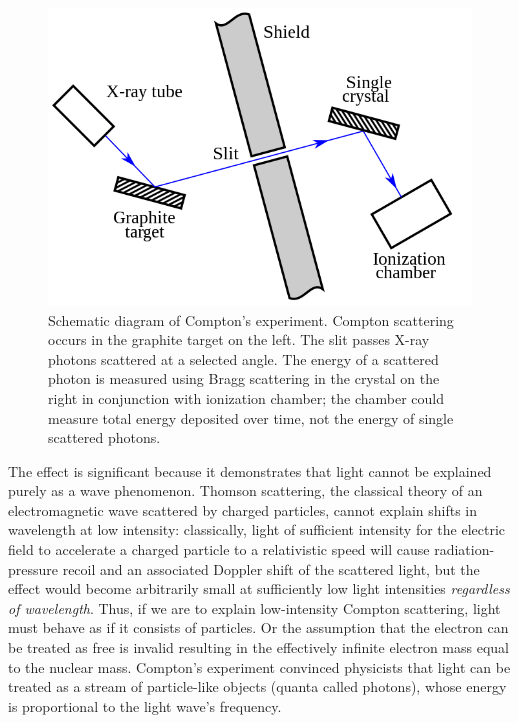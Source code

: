 \documentclass[%
 reprint,
nofootinbib,
 amsmath,amssymb,
 aps,
floatfix,
]{revtex4-2}
\begin{document}
    \begin{figure}
        \centering
        \includegraphics[scale = 0.35]{Figures/Compton-en.svg.png}
        \caption{Schematic diagram of Compton's experiment. Compton scattering occurs in the graphite target on the left. The slit passes X-ray photons scattered at a selected angle. The energy of a scattered photon is measured using Bragg scattering in the crystal on the right in conjunction with ionization chamber; the chamber could measure total energy deposited over time, not the energy of single scattered photons.}
        \label{fig:original}
    \end{figure}
    \par
    The effect is significant because it demonstrates that light cannot be explained purely as a wave phenomenon. Thomson scattering, the classical theory of an electromagnetic wave scattered by charged particles, cannot explain shifts in wavelength at low intensity: classically, light of sufficient intensity for the electric field to accelerate a charged particle to a relativistic speed will cause radiation-pressure recoil and an associated Doppler shift of the scattered light, but the effect would become arbitrarily small at sufficiently low light intensities \textit{regardless of wavelength}. Thus, if we are to explain low-intensity Compton scattering, light must behave as if it consists of particles. Or the assumption that the electron can be treated as free is invalid resulting in the effectively infinite electron mass equal to the nuclear mass. Compton's experiment convinced physicists that light can be treated as a stream of particle-like objects (quanta called photons), whose energy is proportional to the light wave's frequency.
    
\end{document}
